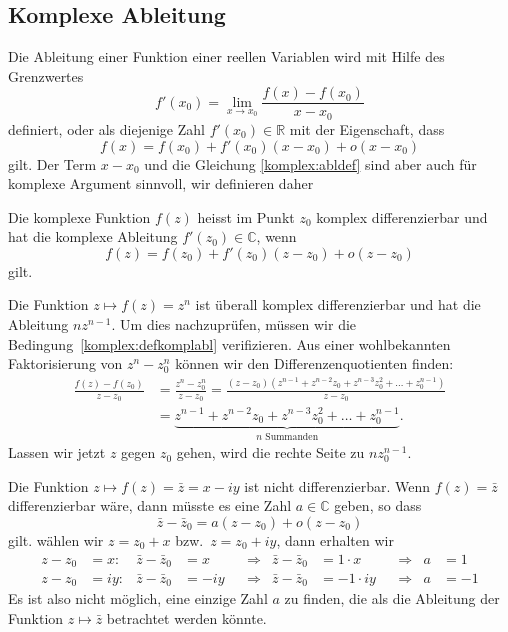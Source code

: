 %
%
\subsection{Komplexe Ableitung}
Die Ableitung einer Funktion einer reellen Variablen wird mit Hilfe des
Grenzwertes
\[
f'(x_0)=\lim_{x\to x_0}\frac{f(x)-f(x_0)}{x-x_0}
\]
definiert, oder als diejenige Zahl $f'(x_0)\in\mathbb R$ mit der Eigenschaft,
dass
\begin{equation}
f(x)=f(x_0)+f'(x_0)(x-x_0) + o(x-x_0)
\label{komplex:abldef}
\end{equation}
gilt.
Der Term $x-x_0$ und die Gleichung \eqref{komplex:abldef} sind aber auch
für komplexe Argument sinnvoll, wir definieren daher

\begin{definition}
\label{buch:funktionentheorie:definition:differenzierbar}
Die komplexe Funktion $f(z)$ heisst im Punkt $z_0$ komplex differenzierbar
und hat die komplexe Ableitung $f'(z_0)\in\mathbb C$, wenn
%
%
%
\begin{equation}
f(z)=f(z_0) + f'(z_0)(z-z_0) +o(z-z_0)
\label{komplex:defkomplabl}
\end{equation}
gilt.
\end{definition}

\begin{beispiel}
Die Funktion $z\mapsto f(z)=z^n$ ist überall komplex differenzierbar
und hat die Ableitung $nz^{n-1}$.
Um dies nachzuprüfen, müssen wir die Bedingung~\eqref{komplex:defkomplabl}
verifizieren.
Aus einer wohlbekannten Faktorisierung von $z^n - z_0^n$ können wir den
Differenzenquotienten finden:
\begin{align*}
\frac{f(z)-f(z_0)}{z-z_0}
&=
\frac{z^n-z_0^n}{z-z_0}
=
\frac{(z-z_0)(z^{n-1}+z^{n-2}z_0+z^{n-3}z_0^2+\dots+z_0^{n-1})}{z-z_0}
\\
&=
\underbrace{z^{n-1}+z^{n-2}z_0+z^{n-3}z_0^2+\dots+z_0^{n-1}
}_{\displaystyle \text{$n$ Summanden}}.
\end{align*}
Lassen wir jetzt $z$ gegen $z_0$ gehen, wird die rechte Seite
zu $nz_0^{n-1}$.
\end{beispiel}

\begin{beispiel}
Die Funktion $z\mapsto f(z)=\bar z=x-iy$ ist nicht differenzierbar.
Wenn $f(z)=\bar z$ differenzierbar wäre, dann müsste es eine Zahl
$a\in\mathbb C$ geben, so dass
\[
\bar z-\bar z_0=a(z-z_0)+o(z-z_0)
\]
gilt.
wählen wir $z=z_0+x$ bzw.~$z=z_0+iy$, dann erhalten wir
\[
\begin{aligned}
z-z_0&=x:&
\bar z-\bar z_0&=x
&&\Rightarrow&
\bar z-\bar z_0&=1\cdot x
&&\Rightarrow&
a&=1
\\
z-z_0&=iy:&
\bar z-\bar z_0&=-iy
&&\Rightarrow&
\bar z-\bar z_0&=-1\cdot iy
&&\Rightarrow&
a&=-1
\end{aligned}
\]
Es ist also nicht möglich, eine einzige Zahl $a$ zu finden, die als
die Ableitung der Funktion $z\mapsto \bar z$ betrachtet werden könnte.
\end{beispiel}

